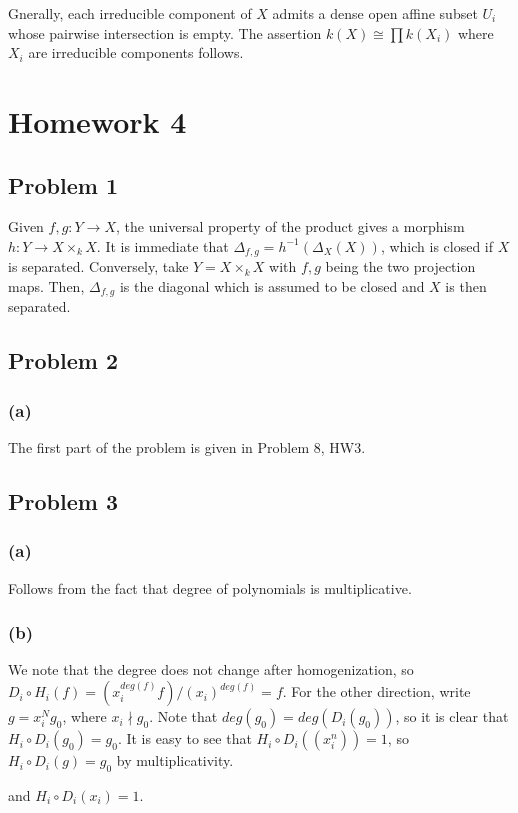 \documentclass{article}
\theoremstyle{definition}
\theoremstyle{definition}
\theoremstyle{definition}
\theoremstyle{definition}
\theoremstyle{definition}
\theoremstyle{definition}
\theoremstyle{definition}
\begin{document}
Gnerally, each irreducible component of $X$ admits a dense open affine subset $U_i$ whose pairwise intersection is empty. The assertion $k(X)\cong \prod k(X_i)$ where $X_i$ are irreducible components follows. 



\section*{Homework 4}

\subsection*{Problem 1}
Given $f,g: Y\to X$, the universal property of the product gives a morphism $h: Y\to X\times_k X$. It is immediate that $\Delta_{f,g}=h^{-1}(\Delta_X(X))$, which is closed if $X$ is separated. Conversely, take $Y=X\times_kX$ with $f,g$ being the two projection maps. Then, $\Delta_{f,g}$ is the diagonal which is assumed to be closed and $X$ is then separated. 

\subsection*{Problem 2}
\subsubsection*{(a)}
The first part of the problem is given in Problem 8, HW3.

\subsection*{Problem 3}
\subsubsection*{(a)}
Follows from the fact that degree of polynomials is multiplicative. 
\subsubsection*{(b)}
We note that the degree does not change after homogenization, so $D_i\circ H_i(f)=(x_i^{deg(f)}f)/(x_{i})^{deg(f)}=f$. For the other direction, write $g=x_i^Ng_0$, where $x_i\nmid g_0$. Note that $deg(g_0)=deg(D_i(g_0))$, so it is clear that $H_i\circ D_i(g_0)=g_0$. It is easy to see that $H_i\circ D_i((x_i^n))=1$, so $H_i\circ D_i(g)=g_0$ by multiplicativity.


and $H_i\circ D_i(x_i)=1$.
\end{document}
